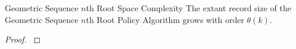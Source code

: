 \begin{theorem}{Geometric Sequence $n$th Root Space Complexity}
\label{thm:geom-seq-nth-root-algo-space-complexity}
The \gls{extant record size} of the Geometric Sequence $n$th Root Policy Algorithm grows with order $\mathcal{\theta}{(k)}.$

\end{theorem}

\begin{proof}
\label{prf:geom-seq-nth-root-algo-space-complexity}



\end{proof}
